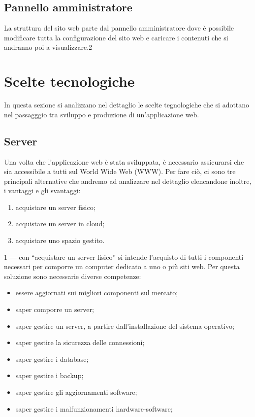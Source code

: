 \documentclass[12pt,a4paper]{article}
\begin{document}
\subsection{Pannello amministratore}
La struttura del sito web parte dal pannello amministratore dove è possibile modificare tutta la configurazione del sito web e caricare i contenuti che si andranno poi a visualizzare.2



























\clearpage
\section{Scelte tecnologiche}
In questa sezione si analizzano nel dettaglio le scelte tegnologiche che si adottano nel passagggio tra sviluppo e produzione di un'applicazione web.

\subsection{Server}

Una volta che l’applicazione web è stata sviluppata, è necessario assicurarsi che sia accessibile a tutti sul World Wide Web (WWW). Per fare ciò, ci sono tre principali alternative che andremo ad analizzare nel dettaglio elencandone inoltre, i vantaggi e gli svantaggi:
\begin{enumerate}
    \item acquistare un server fisico;
    \item acquistare un server in cloud;
    \item acquistare uno spazio gestito.
\end{enumerate}
1 --- con “acquistare un server fisico” si intende l’acquisto di tutti i componenti necessari per comporre un computer dedicato a uno o più siti web. Per questa soluzione sono necessarie diverse competenze:

\begin{itemize}
    \item essere aggiornati sui migliori componenti sul mercato;
    \item saper comporre un server;
    \item saper gestire un server, a partire dall’installazione del sistema operativo;
    \item saper gestire la sicurezza delle connessioni;
    \item saper gestire i database;
    \item saper gestire i backup;
    \item saper gestire gli aggiornamenti software;
    \item saper gestire i malfunzionamenti hardware-software;
\end{itemize}
\end{document}
